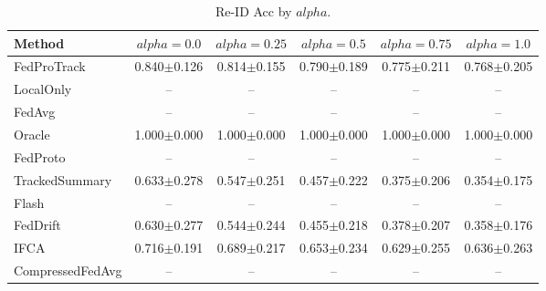 \begin{table}[t]
\centering
\caption{Re-ID Acc by $alpha$.}
\label{tab:alpha_concept_re_id_accuracy}
\begin{tabular}{lccccc}
\toprule
Method & $alpha=0.0$ & $alpha=0.25$ & $alpha=0.5$ & $alpha=0.75$ & $alpha=1.0$ \\
\midrule
FedProTrack & 0.840$\pm$0.126 & 0.814$\pm$0.155 & 0.790$\pm$0.189 & 0.775$\pm$0.211 & 0.768$\pm$0.205 \\
LocalOnly & -- & -- & -- & -- & -- \\
FedAvg & -- & -- & -- & -- & -- \\
Oracle & 1.000$\pm$0.000 & 1.000$\pm$0.000 & 1.000$\pm$0.000 & 1.000$\pm$0.000 & 1.000$\pm$0.000 \\
FedProto & -- & -- & -- & -- & -- \\
TrackedSummary & 0.633$\pm$0.278 & 0.547$\pm$0.251 & 0.457$\pm$0.222 & 0.375$\pm$0.206 & 0.354$\pm$0.175 \\
Flash & -- & -- & -- & -- & -- \\
FedDrift & 0.630$\pm$0.277 & 0.544$\pm$0.244 & 0.455$\pm$0.218 & 0.378$\pm$0.207 & 0.358$\pm$0.176 \\
IFCA & 0.716$\pm$0.191 & 0.689$\pm$0.217 & 0.653$\pm$0.234 & 0.629$\pm$0.255 & 0.636$\pm$0.263 \\
CompressedFedAvg & -- & -- & -- & -- & -- \\
\bottomrule
\end{tabular}
\end{table}